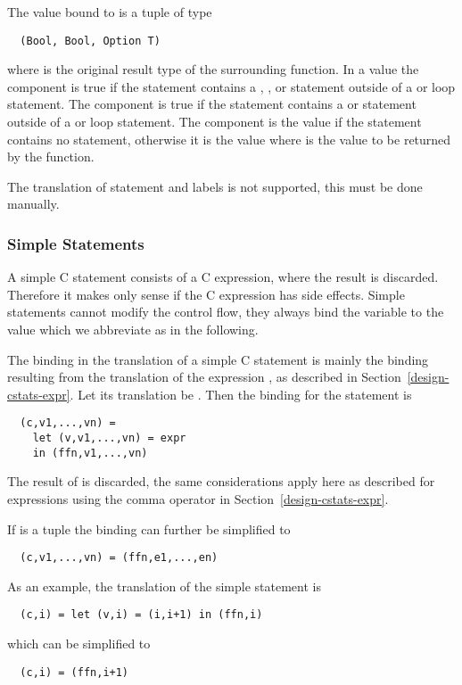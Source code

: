 The value bound to  is a tuple of type 
\begin{verbatim}
  (Bool, Bool, Option T)
\end{verbatim}
where  is the original result type of the surrounding function. In a value  the component
 is true if the statement contains a , , or  statement outside
of a  or loop statement. The component  is true if the statement contains a 
or  statement outside of a  or loop statement. The component  is the value 
 if the statement contains no  statement, otherwise it is the value  where
 is the value to be returned by the function.

The translation of  statement and labels is not supported, this must be done manually.

\subsubsection{Simple Statements}

A simple C statement consists of a C expression, where the result is discarded. Therefore it makes only sense
if the C expression has side effects. Simple statements cannot modify the control flow, they always bind the 
variable  to the value  which we abbreviate as  in the following.

The binding in the translation of a simple C statement  is mainly the binding resulting from the translation 
of the expression , as described in Section~\ref{design-cstats-expr}. Let its translation
be .
Then the binding for the statement  is
\begin{verbatim}
  (c,v1,...,vn) = 
    let (v,v1,...,vn) = expr
    in (ffn,v1,...,vn)
\end{verbatim}

The result  of  is discarded, the same considerations apply here as described for expressions using
the comma operator in Section~\ref{design-cstats-expr}. 

If  is a tuple 
 the binding can further be simplified to
\begin{verbatim}
  (c,v1,...,vn) = (ffn,e1,...,en)
\end{verbatim}

As an example, the translation of the simple statement  is
\begin{verbatim}
  (c,i) = let (v,i) = (i,i+1) in (ffn,i)
\end{verbatim}
which can be simplified to
\begin{verbatim}
  (c,i) = (ffn,i+1)
\end{verbatim}

